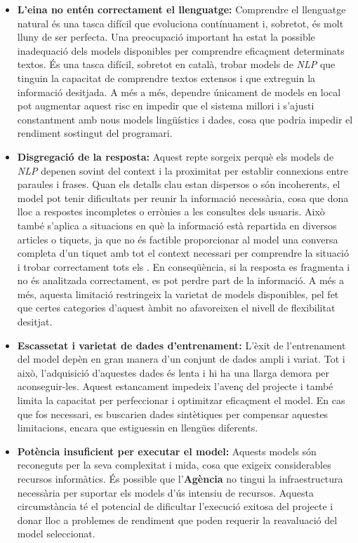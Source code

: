 \begin{itemize}
    \item \textbf{L'eina no entén correctament el llenguatge:} Comprendre el llenguatge natural és una tasca difícil que evoluciona contínuament i, sobretot, és molt lluny de ser perfecta. Una preocupació important ha estat la possible inadequació dels models disponibles per comprendre eficaçment determinats textos. És una tasca difícil, sobretot en català, trobar models de \textit{NLP} que tinguin la capacitat de comprendre textos extensos i que extreguin la informació desitjada. A més a més, dependre únicament de models en local pot augmentar aquest risc en impedir que el sistema millori i s'ajusti constantment amb nous models lingüístics i dades, cosa que podria impedir el rendiment sostingut del programari.
    \item \textbf{Disgregació de la resposta:} Aquest repte sorgeix perquè els models de \textit{NLP} depenen sovint del context i la proximitat per establir connexions entre paraules i frases. Quan els detalls clau estan dispersos o són incoherents, el model pot tenir dificultats per reunir la informació necessària, cosa que dona lloc a respostes incompletes o errònies a les consultes dels usuaris. Això també s'aplica a situacions en què la informació està repartida en diversos articles o tiquets, ja que no és factible proporcionar al model una conversa completa d'un tiquet amb tot el context necessari per comprendre la situació i trobar correctament tots els . En conseqüència, si la resposta es fragmenta i no és analitzada correctament, es pot perdre part de la informació. A més a més, aquesta limitació restringeix la varietat de models disponibles, pel fet que certes categories d'aquest àmbit no afavoreixen el nivell de flexibilitat desitjat.
    \item \textbf{Escassetat i varietat de dades d'entrenament:} L'èxit de l'entrenament del model depèn en gran manera d'un conjunt de dades ampli i variat. Tot i això, l'adquisició d'aquestes dades és lenta i hi ha una llarga demora per aconseguir-les. Aquest estancament impedeix l'avenç del projecte i també limita la capacitat per perfeccionar i optimitzar eficaçment el model. En cas que fos necessari, es buscarien dades sintètiques per compensar aquestes limitacions, encara que estiguessin en llengües diferents.
    \item \textbf{Potència insuficient per executar el model:} Aquests models són reconeguts per la seva complexitat i mida, cosa que exigeix considerables recursos informàtics. És possible que l'\textbf{Agència} no tingui la infraestructura necessària per suportar els models d'ús intensiu de recursos. Aquesta circumstància té el potencial de dificultar l'execució exitosa del projecte i donar lloc a problemes de rendiment que poden requerir la reavaluació del model seleccionat.

\end{itemize}
